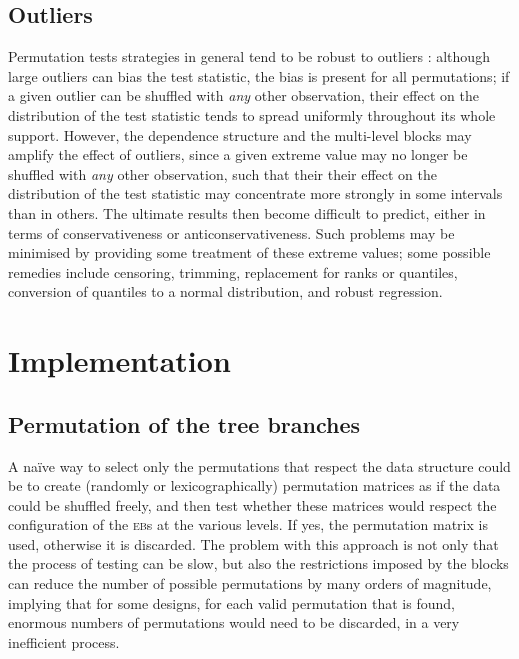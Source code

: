 \subsection{Outliers}

Permutation tests strategies in general tend to be robust to outliers \citep{Anderson1999, Good2005}: although large outliers can bias the test statistic, the bias is present for all permutations; if a given outlier can be shuffled with \emph{any} other observation, their effect on the distribution of the test statistic tends to spread uniformly throughout its whole support. However, the dependence structure and the multi-level blocks may amplify the effect of outliers, since a given extreme value may no longer be shuffled with \emph{any} other observation, such that their their effect on the distribution of the test statistic may concentrate more strongly in some intervals than in others. The ultimate results then become difficult to predict, either in terms of conservativeness or anticonservativeness. Such problems may be minimised by providing some treatment of these extreme values; some possible remedies include censoring, trimming, replacement for ranks or quantiles, conversion of quantiles to a normal distribution, and robust regression.

\section{Implementation}
\label{sec:ptree:implementation}

\subsection{Permutation of the tree branches}

A na\"{i}ve way to select only the permutations that respect the data structure could be to create (randomly or lexicographically) permutation matrices as if the data could be shuffled freely, and then test whether these matrices would respect the configuration of the \textsc{eb}s at the various levels. If yes, the permutation matrix is used, otherwise it is discarded. The problem with this approach is not only that the process of testing can be slow, but also the restrictions imposed by the blocks can reduce the number of possible permutations by many orders of magnitude, implying that for some designs, for each valid permutation that is found, enormous numbers of permutations would need to be discarded, in a very inefficient process.

